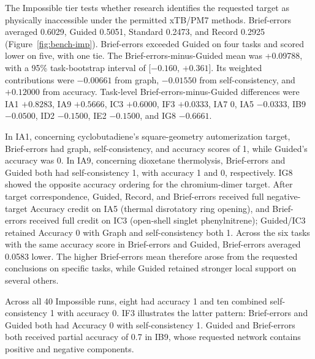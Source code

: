 The Impossible tier tests whether research identifies the requested target as physically inaccessible under the permitted xTB/PM7 methods. Brief-errors averaged 0.6029, Guided 0.5051, Standard 0.2473, and Record 0.2925 (Figure~\ref{fig:bench-imp}). Brief-errors exceeded Guided on four tasks and scored lower on five, with one tie. The Brief-errors-minus-Guided mean was +0.09788, with a 95\% task-bootstrap interval of [$-0.160$, $+0.361$]. Its weighted contributions were $-0.00661$ from graph, $-0.01550$ from self-consistency, and $+0.12000$ from accuracy. Task-level Brief-errors-minus-Guided differences were IA1 $+0.8283$, IA9 $+0.5666$, IC3 $+0.6000$, IF3 $+0.0333$, IA7 $0$, IA5 $-0.0333$, IB9 $-0.0500$, ID2 $-0.1500$, IE2 $-0.1500$, and IG8 $-0.6661$.

In IA1, concerning cyclobutadiene's square-geometry automerization target, Brief-errors had graph, self-consistency, and accuracy scores of 1, while Guided's accuracy was 0. In IA9, concerning dioxetane thermolysis, Brief-errors and Guided both had self-consistency 1, with accuracy 1 and 0, respectively. IG8 showed the opposite accuracy ordering for the chromium-dimer target. After target correspondence, Guided, Record, and Brief-errors received full negative-target Accuracy credit on IA5 (thermal disrotatory ring opening), and Brief-errors received full credit on IC3 (open-shell singlet phenylnitrene); Guided/IC3 retained Accuracy 0 with Graph and self-consistency both 1. Across the six tasks with the same accuracy score in Brief-errors and Guided, Brief-errors averaged 0.0583 lower. The higher Brief-errors mean therefore arose from the requested conclusions on specific tasks, while Guided retained stronger local support on several others.

Across all 40 Impossible runs, eight had accuracy 1 and ten combined self-consistency 1 with accuracy 0. IF3 illustrates the latter pattern: Brief-errors and Guided both had Accuracy 0 with self-consistency 1. Guided and Brief-errors both received partial accuracy of 0.7 in IB9, whose requested network contains positive and negative components.
